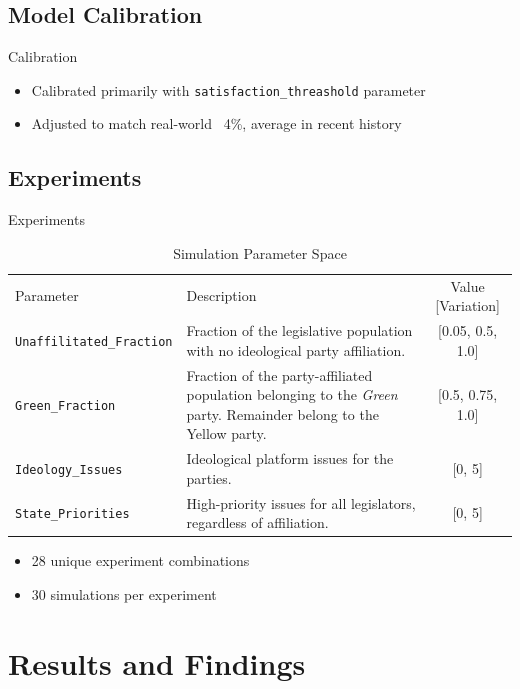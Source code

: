 \documentclass[14pt]{beamer}
\begin{document}
\subsection*{Model Calibration} %
\begin{frame}{Calibration}
\begin{itemize}
\item Calibrated primarily with \texttt{satisfaction\_threashold} parameter
\item Adjusted to match real-world ~4\%, average in recent history
\end{itemize}
\end{frame}


\subsection*{Experiments} %
\begin{frame}{Experiments}

\begin{table}[htp]
\tiny
 \caption{Simulation Parameter Space}
 \begin{tabular}{lp{2.17in}c}
 \hline\noalign{\smallskip}
 Parameter & Description & Value [Variation] \\
 \noalign{\smallskip}
 \hline
 \noalign{\smallskip}
 \texttt{Unaffilitated\_Fraction} & Fraction of the legislative population with no ideological party  affiliation. & [0.05, 0.5, 1.0] \\
 \texttt{Green\_Fraction} & Fraction of the party-affiliated population belonging to the \textit{Green} party. Remainder belong to the Yellow party. & [0.5, 0.75, 1.0] \\
 \texttt{Ideology\_Issues} & Ideological platform issues for the parties. & [0, 5] \\
 \texttt{State\_Priorities} & High-priority issues for all legislators, regardless of affiliation. & [0, 5] \\
 \hline
 \end{tabular}
 \label{params}
\end{table}

\begin{itemize}
\item 28 unique experiment combinations
\item 30 simulations per experiment 
\end{itemize}
\end{frame}


\section*{Results and Findings} %
\end{document}
